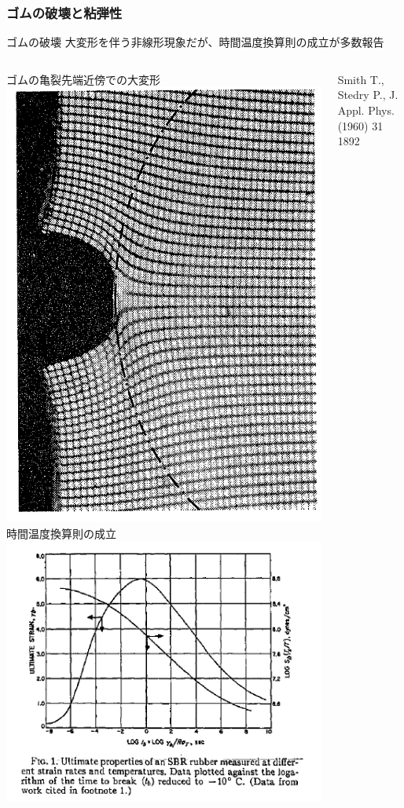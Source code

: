 \documentclass[11pt, dvipdfmx]{beamer}
\begin{document}
\begin{frame}
\frametitle{ゴムの破壊と粘弾性}

\vspace{-2mm}
\begin{alertblock}{ゴムの破壊}
大変形を伴う非線形現象だが、時間温度換算則の成立が多数報告
\end{alertblock}

\begin{columns}[totalwidth=1\textwidth]
ゴムの亀裂先端近傍での大変形
\centering
\includegraphics[width=.7\textwidth]{./fig/rubber_crack.png}
時間温度換算則の成立
\centering
\includegraphics[width=\textwidth]{./fig/Time_Temp_2.png}

{\tiny Smith T., Stedry P., J. Appl. Phys. (1960) 31 1892}

\end{columns}
\end{frame}
\end{document}
